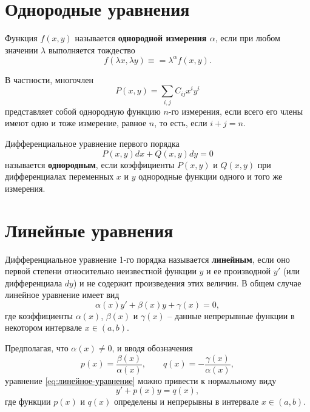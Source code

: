 \documentclass[a5paper, 11pt]{extbook}
\theoremstyle{definition}
\theoremstyle{definition}
\begin{document}
\section{Однородные уравнения}

Функция \(f(x, y)\) называется \textbf{однородной измерения \(\alpha\)}, если при любом значении \(\lambda\) выполняется тождество
\begin{equation}
    f(\lambda x, \lambda y) \equiv = \lambda^{\alpha} f(x, y).
\end{equation}

В частности, многочлен
\[
    P(x, y) = \sum_{i, j} C_{ij} x^i y^i
\]
представляет собой однородную функцию \(n\)-го измерения, если всего его члены имеют одно и тоже измерение, равное \(n\), то есть, если \(i + j = n\).

Дифференциальное уравнение первого порядка
\begin{equation}
    P(x, y) dx + Q(x, y) dy = 0
\end{equation}
называется \textbf{однородным}, если коэффициенты \(P(x, y)\) и \(Q(x, y)\) при дифференциалах переменных \(x\) и \(y\) однородные функции одного и того же измерения.

\section{Линейные уравнения}

Дифференциальное уравнение 1-го порядка называется \textbf{линейным}, если оно первой степени относительно неизвестной функции \(y\) и ее производной \(y'\) (или дифференциала \(dy\)) и не содержит произведения этих величин. В общем случае линейное уравнение имеет вид
\begin{equation}
    \label{eq:линейное-уравнение}
    \alpha(x) y' + \beta(x) y + \gamma(x) = 0,
\end{equation}
где коэффициенты \(\alpha(x)\), \(\beta(x)\) и \(\gamma(x)\) -- данные непрерывные функции в некотором интервале \(x \in (a, b)\).

Предполагая, что \(\alpha(x) \neq 0\), и вводя обозначения
\[
    p(x) = \frac{\beta(x)}{\alpha(x)},
    \qquad
    q(x) = -\frac{\gamma(x)}{\alpha(x)},
\]
уравнение \eqref{eq:линейное-уравнение} можно привести к нормальному виду
\begin{equation}
    \label{eq:нормальное-линейное-уравнение}
    y' + p(x)y = q(x),
\end{equation}
где функции \(p(x)\) и \(q(x)\) определены и непрерывны в интервале \(x \in (a, b)\).
\end{document}
